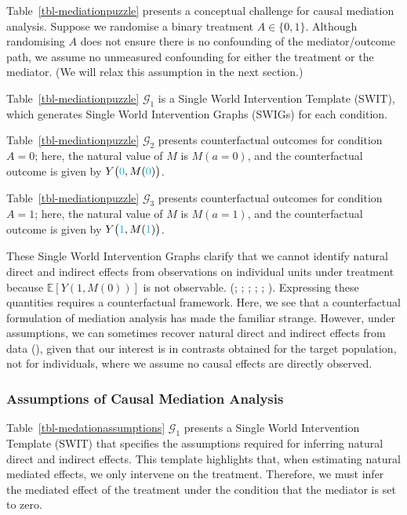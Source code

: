 \documentclass[
  single column]{article}
\begin{document}
Table~\ref{tbl-mediationpuzzle} presents a conceptual challenge for
causal mediation analysis. Suppose we randomise a binary treatment
\(A \in \{0,1\}\). Although randomising \(A\) does not ensure there is
no confounding of the mediator/outcome path, we assume no unmeasured
confounding for either the treatment or the mediator. (We will relax
this assumption in the next section.)

Table~\ref{tbl-mediationpuzzle} \(\mathcal{G}_1\) is a Single World
Intervention Template (SWIT), which generates Single World Intervention
Graphs (SWIGs) for each condition.

Table~\ref{tbl-mediationpuzzle} \(\mathcal{G}_2\) presents
counterfactual outcomes for condition \(A = 0\); here, the natural value
of \(M\) is \(M(a = 0)\), and the counterfactual outcome is given by
\(Y\big(\textcolor{cyan}{0}, M(\textcolor{cyan}{0})\big)\).

Table~\ref{tbl-mediationpuzzle} \(\mathcal{G}_3\) presents
counterfactual outcomes for condition \(A = 1\); here, the natural value
of \(M\) is \(M(a = 1)\), and the counterfactual outcome is given by
\(Y\big(\textcolor{cyan}{1}, M(\textcolor{cyan}{1})\big)\).

These Single World Intervention Graphs clarify that we cannot identify
natural direct and indirect effects from observations on individual
units under treatment because \(\mathbb{E}[Y(1, M(0))]\) is not
observable. (;
;
;
;
;
). Expressing
these quantities requires a counterfactual framework. Here, we see that
a counterfactual formulation of mediation analysis has made the familiar
strange. However, under assumptions, we can sometimes recover natural
direct and indirect effects from data
(), given that our
interest is in contrasts obtained for the target population, not for
individuals, where we assume no causal effects are directly observed.

\subsubsection{Assumptions of Causal Mediation
Analysis}\label{assumptions-of-causal-mediation-analysis}

Table~\ref{tbl-medationassumptions} \(\mathcal{G}_1\) presents a Single
World Intervention Template (SWIT) that specifies the assumptions
required for inferring natural direct and indirect effects. This
template highlights that, when estimating natural mediated effects, we
only intervene on the treatment. Therefore, we must infer the mediated
effect of the treatment under the condition that the mediator is set to
zero.
\end{document}
